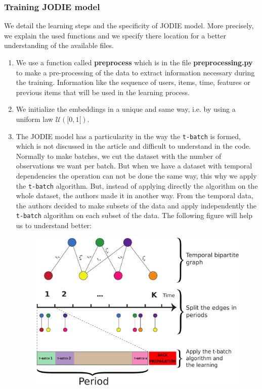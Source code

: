\subsubsection{Training JODIE model} 

We detail the learning steps and the specificity of JODIE model. More precisely, we explain the used functions and we specify there location for a better understanding of the available files.

\begin{enumerate}
    \item We use a function called \textbf{preprocess} which is in the file \textbf{preprocessing.py} to make a pre-processing of the data to extract information necessary during the training. Information like the sequence of users, items, time, features or previous items that will be used in the learning process.
    \item We initialize the embeddings in a unique and same way, i.e. by using a uniform law $\mathcal{U}([0,1[)$.
    \item The JODIE model has a particularity in the way the \texttt{t-batch} is formed, which is not discussed in the article and difficult to understand in the code. Normally to make batches, we cut the dataset with the number of observations we want per batch. But when we have a dataset with temporal dependencies the operation can not be done the same way, this why we apply the \texttt{t-batch} algorithm. But, instead of applying directly the algorithm on the whole dataset, the authors made it in another way. From the temporal data, the authors decided to make subsets of the data and apply independently the \texttt{t-batch} algorithm on each subset of the data. The following figure will help us to understand better:
    \begin{figure}[H]
        \centering
        \includegraphics[scale = 0.43]{image/pipeline-jodie.pdf}

\end{figure}
\end{enumerate}
